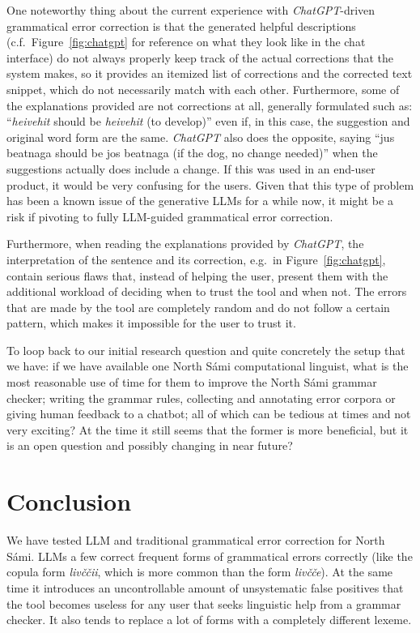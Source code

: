 \documentclass[free]{flammie}
\begin{document}
One noteworthy thing about the current experience with \textit{ChatGPT}-driven
grammatical error correction is that the generated helpful descriptions
(c.f.~Figure~\ref{fig:chatgpt} for reference on what they look like in the chat
interface) do not always properly keep track of the actual corrections that the
system makes, so it provides an itemized list of corrections and the corrected
text snippet, which do not necessarily match with each other. Furthermore, some
of the explanations provided are not corrections at all, generally formulated
such as: ``\textit{heivehit} should be \textit{heivehit} (to develop)'' even if,
in this case, the suggestion and original word form are the same.
\textit{ChatGPT} also does the opposite, saying ``jus beatnaga should be jos
beatnaga (if the dog, no change needed)'' when the suggestions actually does
include a change. If this was used in an end-user product, it would be very
confusing for the users. Given that this type of problem has been a known issue
of the generative LLMs for a while now, it might be a risk if pivoting to fully
LLM-guided grammatical error correction.

Furthermore, when reading the explanations provided by \textit{ChatGPT}, the
interpretation of the sentence and its correction, e.g.\ in
Figure~\ref{fig:chatgpt}, contain serious flaws that, instead of helping the
user, present them with the additional workload of deciding when to trust the
tool and when not. The errors that are made by the tool are completely random
and do not follow a certain pattern, which makes it impossible for the user to
trust it.

To loop back to our initial research question and quite concretely the setup
that we have: if we have available one North Sámi computational linguist, what
is the most reasonable use of time for them to improve the North Sámi grammar
checker; writing the grammar rules, collecting and annotating error corpora or
giving human feedback to a chatbot; all of which can be tedious at times and not
very exciting? At the time it still seems that the former is more beneficial,
but it is an open question and possibly changing in near future?

\section{Conclusion}

We have tested LLM and traditional grammatical error correction for North Sámi.
LLMs a few correct frequent forms of grammatical errors correctly (like the
copula form \textit{livččii}, which is more common than the form
\textit{livčče}). At the same time it introduces an uncontrollable amount of
unsystematic false positives that the tool becomes useless for any user that
seeks linguistic help from a grammar checker.  It also tends to replace a lot of
forms with a completely different lexeme.
\end{document}

